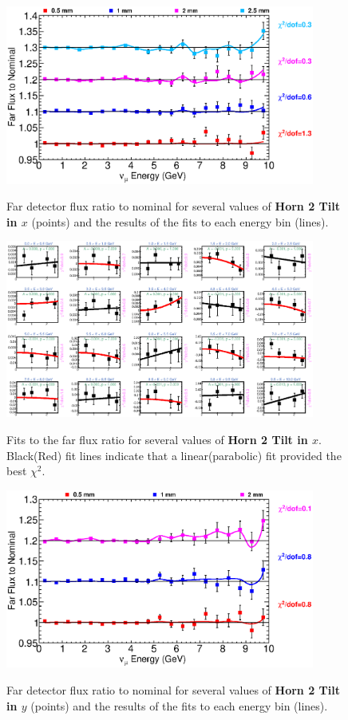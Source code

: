 \begin{figure}[ht]
  \begin{center}
    {\includegraphics[width=4.0in]{figures/Horn2XTilt_far_summary.eps}}
  \end{center}
\caption{ Far detector flux ratio to nominal for several values of {\bf Horn 2 Tilt in $x$} (points) and the results of the fits to each energy bin (lines).}
\end{figure}

\begin{figure}[hb]
  \begin{center}
    {\includegraphics[width=4.0in]{figures/Horn2XTilt_far_fits.eps}}
  \end{center}
\caption{ Fits to the far flux ratio for several values of {\bf Horn 2 Tilt in $x$}. Black(Red) fit lines indicate that a linear(parabolic) fit provided the best $\chi^2$. }
\end{figure}

\begin{figure}[ht]
  \begin{center}
    {\includegraphics[width=4.0in]{figures/Horn2YTilt_far_summary.eps}}
  \end{center}
\caption{ Far detector flux ratio to nominal for several values of {\bf Horn 2 Tilt in $y$} (points) and the results of the fits to each energy bin (lines).}
\end{figure}


